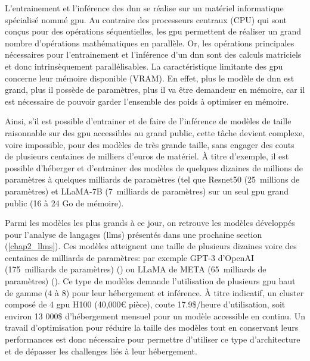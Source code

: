 L'entrainement et l'inférence des \gls{dnn} se réalise sur un matériel informatique spécialisé nommé \gls{gpu}. Au contraire des processeurs centraux (CPU) qui sont conçus pour des opérations séquentielles, les \gls{gpu} permettent de réaliser un grand nombre d'opérations mathématiques en parallèle. Or, les opérations principales nécessaires pour l'entrainement et l'inférence d'un \gls{dnn} sont des calculs matriciels et donc intrinsèquement parallélisables. La caractéristique limitante des \gls{gpu} concerne leur mémoire disponible (VRAM). En effet, plus le modèle de \gls{dnn} est grand, plus il possède de paramètres, plus il va être demandeur en mémoire, car il est nécessaire de pouvoir garder l'ensemble des poids à optimiser en mémoire. 


Ainsi, s'il est possible d'entrainer et de faire de l'inférence de modèles de taille raisonnable sur des \gls{gpu} accessibles au grand public, cette tâche devient complexe, voire impossible, pour des modèles de très grande taille, sans engager des couts de plusieurs centaines de milliers d'euros de matériel. À titre d'exemple, il est possible d'héberger et d'entrainer des modèles de quelques dizaines de millions de paramètres à quelques milliards de paramètres (tel que Resnet50 (25~millions de paramètres) et LLaMA-7B (7~milliards de paramètres) sur un seul \gls{gpu} grand public (16 à 24 Go de mémoire). 


Parmi les modèles les plus grands à ce jour, on retrouve les modèles développés pour l'analyse de langages (\gls{llms}) présentés dans une prochaine section (\ref{chap2_llms}). Ces modèles atteignent une taille de plusieurs dizaines voire des centaines de milliards de paramètres: par exemple GPT-3 d'OpenAI (175~milliards de paramètres) (\cite{brown_language_2020}) ou LLaMA de META (65~milliards de paramètres) (\cite{touvron_llama_2023}). Ce type de modèles demande l'utilisation de plusieurs \gls{gpu} haut de gamme (4 à 8) pour leur hébergement et inférence. À titre indicatif, un cluster composé de 4 \gls{gpu} H100 (40,000€ pièce), coute 17.9\$/heure d'utilisation, soit environ 13 000\$ d'hébergement mensuel pour un modèle accessible en continu. Un travail d'optimisation pour réduire la taille des modèles tout en conservant leurs performances est donc nécessaire pour permettre d'utiliser ce type d'architecture et de dépasser les challenges liés à leur hébergement.

